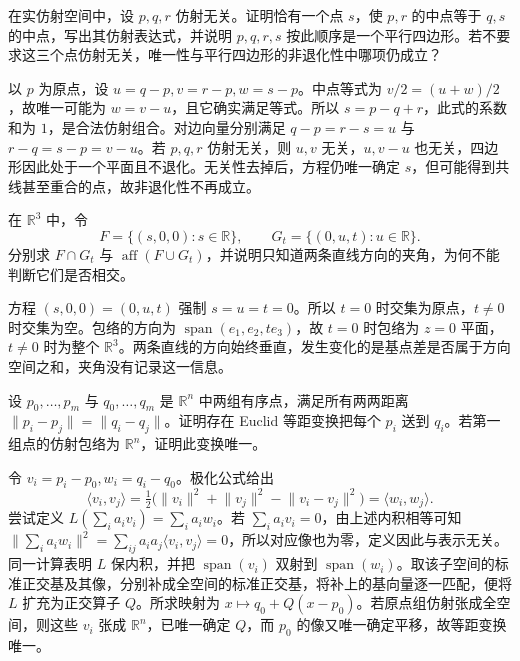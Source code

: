 \begin{exercise}\label{g1:ex:parallelogram-midpoints}
	在实仿射空间中，设 \(p,q,r\) 仿射无关。证明恰有一个点 \(s\)，使 \(p,r\) 的中点等于 \(q,s\) 的中点，写出其仿射表达式，并说明 \(p,q,r,s\) 按此顺序是一个平行四边形。若不要求这三个点仿射无关，唯一性与平行四边形的非退化性中哪项仍成立？
\end{exercise}
\begin{solution}
	以 \(p\) 为原点，设 \(u=q-p,v=r-p,w=s-p\)。中点等式为 \(v/2=(u+w)/2\)，故唯一可能为 \(w=v-u\)，且它确实满足等式。所以 \(s=p-q+r\)，此式的系数和为 \(1\)，是合法仿射组合。对边向量分别满足 \(q-p=r-s=u\) 与 \(r-q=s-p=v-u\)。若 \(p,q,r\) 仿射无关，则 \(u,v\) 无关，\(u,v-u\) 也无关，四边形因此处于一个平面且不退化。无关性去掉后，方程仍唯一确定 \(s\)，但可能得到共线甚至重合的点，故非退化性不再成立。
\end{solution}

\begin{exercise}\label{g1:ex:affine-intersection-parameter}
	在 \(\mathbb R^3\) 中，令
	\[
		F=\{(s,0,0):s\in\mathbb R\},\qquad
		G_t=\{(0,u,t):u\in\mathbb R\}.
	\]
	分别求 \(F\cap G_t\) 与 \(\operatorname{aff}(F\cup G_t)\)，并说明只知道两条直线方向的夹角，为何不能判断它们是否相交。
\end{exercise}
\begin{solution}
	方程 \((s,0,0)=(0,u,t)\) 强制 \(s=u=t=0\)。所以 \(t=0\) 时交集为原点，\(t\ne0\) 时交集为空。包络的方向为 \(\operatorname{span}(e_1,e_2,te_3)\)，故 \(t=0\) 时包络为 \(z=0\) 平面， \(t\ne0\) 时为整个 \(\mathbb R^3\)。两条直线的方向始终垂直，发生变化的是基点差是否属于方向空间之和，夹角没有记录这一信息。
\end{solution}

\begin{exercise}\label{g1:ex:distance-configurations}
	设 \(p_0,\ldots,p_m\) 与 \(q_0,\ldots,q_m\) 是 \(\mathbb R^n\) 中两组有序点，满足所有两两距离 \(\lVert p_i-p_j\rVert=\lVert q_i-q_j\rVert\)。证明存在 Euclid 等距变换把每个 \(p_i\) 送到 \(q_i\)。若第一组点的仿射包络为 \(\mathbb R^n\)，证明此变换唯一。
\end{exercise}
\begin{solution}
	令 \(v_i=p_i-p_0,w_i=q_i-q_0\)。极化公式给出
	\[
		\langle v_i,v_j\rangle
		=\tfrac12\bigl(\lVert v_i\rVert^2+\lVert v_j\rVert^2-\lVert v_i-v_j\rVert^2\bigr)
		=\langle w_i,w_j\rangle.
	\]
	尝试定义 \(L(\sum_i a_iv_i)=\sum_i a_iw_i\)。若 \(\sum_i a_iv_i=0\)，由上述内积相等可知 \(\lVert\sum_i a_iw_i\rVert^2=\sum_{ij}a_ia_j\langle v_i,v_j\rangle=0\)，所以对应像也为零，定义因此与表示无关。同一计算表明 \(L\) 保内积，并把 \(\operatorname{span}(v_i)\) 双射到 \(\operatorname{span}(w_i)\)。取该子空间的标准正交基及其像，分别补成全空间的标准正交基，将补上的基向量逐一匹配，便将 \(L\) 扩充为正交算子 \(Q\)。所求映射为 \(x\mapsto q_0+Q(x-p_0)\)。若原点组仿射张成全空间，则这些 \(v_i\) 张成 \(\mathbb R^n\)，已唯一确定 \(Q\)，而 \(p_0\) 的像又唯一确定平移，故等距变换唯一。
\end{solution}

